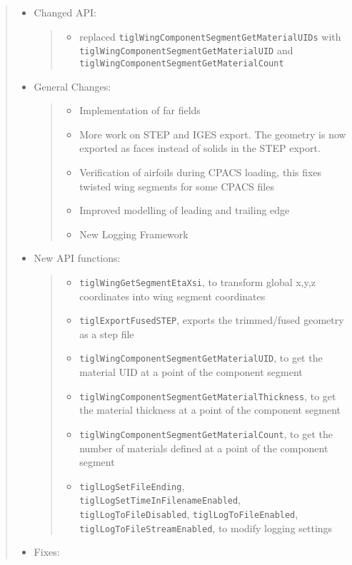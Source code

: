 \documentclass[]{scrartcl}
\begin{document}
\begin{quote}
\begin{itemize}
\item
  Changed API:

  \begin{quote}
  \begin{itemize}
  \itemsep1pt\parskip0pt
  \item
    replaced \texttt{tiglWingComponentSegmentGetMaterialUIDs} with
    \texttt{tiglWingComponentSegmentGetMaterialUID} and
    \texttt{tiglWingComponentSegmentGetMaterialCount}
  \end{itemize}
  \end{quote}
\item
  General Changes:

  \begin{quote}
  \begin{itemize}
  \itemsep1pt\parskip0pt
  \item
    Implementation of far fields
  \item
    More work on STEP and IGES export. The geometry is now exported as
    faces instead of solids in the STEP export.
  \item
    Verification of airfoils during CPACS loading, this fixes twisted
    wing segments for some CPACS files
  \item
    Improved modelling of leading and trailing edge
  \item
    New Logging Framework
  \end{itemize}
  \end{quote}
\item
  New API functions:

  \begin{quote}
  \begin{itemize}
  \itemsep1pt\parskip0pt
  \item
    \texttt{tiglWingGetSegmentEtaXsi}, to transform global x,y,z
    coordinates into wing segment coordinates
  \item
    \texttt{tiglExportFusedSTEP}, exports the trimmed/fused geometry as
    a step file
  \item
    \texttt{tiglWingComponentSegmentGetMaterialUID}, to get the material
    UID at a point of the component segment
  \item
    \texttt{tiglWingComponentSegmentGetMaterialThickness}, to get the
    material thickness at a point of the component segment
  \item
    \texttt{tiglWingComponentSegmentGetMaterialCount}, to get the number
    of materials defined at a point of the component segment
  \item
    \texttt{tiglLogSetFileEnding},
    \texttt{tiglLogSetTimeInFilenameEnabled},
    \texttt{tiglLogToFileDisabled}, \texttt{tiglLogToFileEnabled},
    \texttt{tiglLogToFileStreamEnabled}, to modify logging settings
  \end{itemize}
  \end{quote}
\item
  Fixes:


\end{itemize}
\end{quote}
\end{document}
